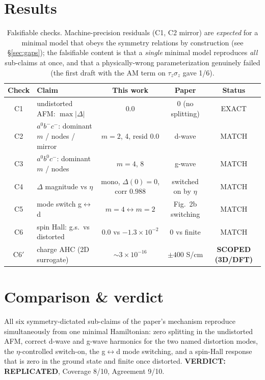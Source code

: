 \documentclass[11pt]{article}
\begin{document}
\section{Results}
\begin{table}[h]\centering
\begin{tabular}{clccc}
\toprule
Check & Claim & This work & Paper & Status\\
\midrule
C1 & undistorted AFM: $\max|\Delta|$ & $0.0$ & $0$ (no splitting) & EXACT\\
C2 & $a^0b^-c^-$: dominant $m$ / nodes / mirror & $m{=}2$, 4, resid $0.0$ & d-wave & MATCH\\
C3 & $a^0b^0c^-$: dominant $m$ / nodes & $m{=}4$, 8 & g-wave & MATCH\\
C4 & $\Delta$ magnitude vs $\eta$ & mono, $\Delta(0){=}0$, corr $0.988$ & switched on by $\eta$ & MATCH\\
C5 & mode switch g$\leftrightarrow$d & $m{=}4\leftrightarrow m{=}2$ & Fig.~2b switching & MATCH\\
C6 & spin Hall: g.s.\ vs distorted & $0.0$ vs $-1.3\times10^{-2}$ & $0$ vs finite & MATCH\\
\midrule
C6$'$ & charge AHC (2D surrogate) & $\sim3\times10^{-16}$ & $\pm400$ S/cm & \textbf{SCOPED (3D/DFT)}\\
\bottomrule
\end{tabular}
\caption{Falsifiable checks. Machine-precision residuals (C1, C2 mirror) are
\emph{expected} for a minimal model that obeys the symmetry relations by construction
(see \S\ref{sec:gaps}); the falsifiable content is that a \emph{single} minimal model
reproduces \emph{all} sub-claims at once, and that a physically-wrong parameterization
genuinely failed (the first draft with the AM term on $\tau_z\sigma_z$ gave 1/6).}
\end{table}

\section{Comparison \& verdict}
All six symmetry-dictated sub-claims of the paper's mechanism reproduce simultaneously
from one minimal Hamiltonian: zero splitting in the undistorted AFM, correct d-wave and
g-wave harmonics for the two named distortion modes, the $\eta$-controlled switch-on, the
g$\leftrightarrow$d mode switching, and a spin-Hall response that is zero in the ground
state and finite once distorted. \textbf{VERDICT: REPLICATED}, Coverage 8/10, Agreement 9/10.
\end{document}
